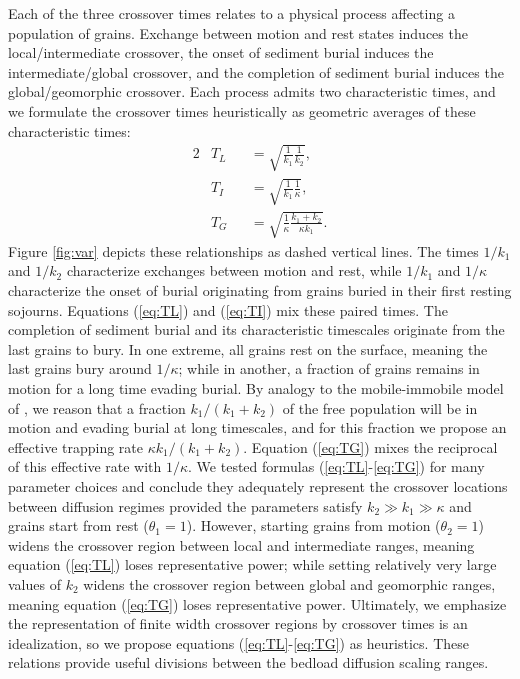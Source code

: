 \documentclass[]{agujournal2018}
\begin{document}
Each of the three crossover times relates to a physical process affecting a population of grains.
Exchange between motion and rest states induces the local/intermediate crossover, the onset of sediment burial induces the intermediate/global crossover, and the completion of sediment burial induces the global/geomorphic crossover.
Each process admits two characteristic times, and we formulate the crossover times heuristically as geometric averages of these characteristic times:
\begin{alignat}{2}
&T_L &&= \sqrt{\frac{1}{k_1}\frac{1}{k_2}}, \label{eq:TL}\\
&T_I &&= \sqrt{\frac{1}{k_1}\frac{1}{\kappa}},\label{eq:TI}\\
&T_G &&= \sqrt{\frac{1}{\kappa}\frac{k_1+k_2}{\kappa k_1}} \label{eq:TG}.
\end{alignat}
Figure \ref{fig:var} depicts these relationships as dashed vertical lines.
The times $1/k_1$ and $1/k_2$ characterize exchanges between motion and rest, while $1/k_1$ and $1/\kappa$ characterize the onset of burial originating from grains buried in their first resting sojourns.
Equations (\ref{eq:TL}) and (\ref{eq:TI}) mix these paired times.
The completion of sediment burial and its characteristic timescales originate from the last grains to bury.
In one extreme, all grains rest on the surface, meaning the last grains bury around $1/\kappa$; while in another, a fraction of grains remains in motion for a long time evading burial.
By analogy to the mobile-immobile model of \citet{Ancey2006}, we reason that a fraction $k_1/(k_1+k_2)$ of the free population will be in motion and evading burial at long timescales, and for this fraction we propose an effective trapping rate $\kappa k_1/(k_1+k_2)$.
Equation (\ref{eq:TG}) mixes the reciprocal of this effective rate with $1/\kappa$.
We tested formulas (\ref{eq:TL}-\ref{eq:TG}) for many parameter choices and conclude they adequately represent the crossover locations between diffusion regimes provided the parameters satisfy $k_2\gg k_1 \gg \kappa$ and grains start from rest ($\theta_1=1$).
However, starting grains from motion ($\theta_2=1$) widens the crossover region between local and intermediate ranges, meaning equation (\ref{eq:TL}) loses representative power; while setting relatively very large values of $k_2$ widens the crossover region between global and geomorphic ranges, meaning equation (\ref{eq:TG}) loses representative power.
Ultimately, we emphasize the representation of finite width crossover regions by crossover times is an idealization, so we propose equations (\ref{eq:TL}-\ref{eq:TG}) as heuristics. 
These relations provide useful divisions between the bedload diffusion scaling ranges.
\end{document}

